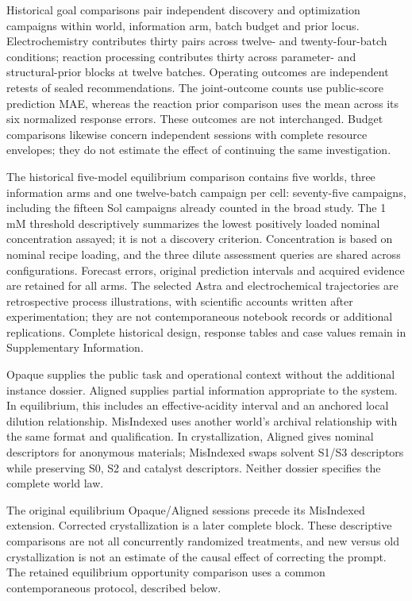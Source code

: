 \documentclass[10pt,a4paper]{article}
\begin{document}
Historical goal comparisons pair independent discovery and optimization campaigns within world, information arm, batch budget and prior locus. Electrochemistry contributes thirty pairs across twelve- and twenty-four-batch conditions; reaction processing contributes thirty across parameter- and structural-prior blocks at twelve batches. Operating outcomes are independent retests of sealed recommendations. The joint-outcome counts use public-score prediction MAE, whereas the reaction prior comparison uses the mean across its six normalized response errors. These outcomes are not interchanged. Budget comparisons likewise concern independent sessions with complete resource envelopes; they do not estimate the effect of continuing the same investigation.

The historical five-model equilibrium comparison contains five worlds, three information arms and one twelve-batch campaign per cell: seventy-five campaigns, including the fifteen Sol campaigns already counted in the broad study. The 1 mM threshold descriptively summarizes the lowest positively loaded nominal concentration assayed; it is not a discovery criterion. Concentration is based on nominal recipe loading, and the three dilute assessment queries are shared across configurations. Forecast errors, original prediction intervals and acquired evidence are retained for all arms. The selected Astra and electrochemical trajectories are retrospective process illustrations, with scientific accounts written after experimentation; they are not contemporaneous notebook records or additional replications. Complete historical design, response tables and case values remain in Supplementary Information.

Opaque supplies the public task and operational context without the additional instance dossier. Aligned supplies partial information appropriate to the system. In equilibrium, this includes an effective-acidity interval and an anchored local dilution relationship. MisIndexed uses another world's archival relationship with the same format and qualification. In crystallization, Aligned gives nominal descriptors for anonymous materials; MisIndexed swaps solvent S1/S3 descriptors while preserving S0, S2 and catalyst descriptors. Neither dossier specifies the complete world law.

The original equilibrium Opaque/Aligned sessions precede its MisIndexed extension. Corrected crystallization is a later complete block. These descriptive comparisons are not all concurrently randomized treatments, and new versus old crystallization is not an estimate of the causal effect of correcting the prompt. The retained equilibrium opportunity comparison uses a common contemporaneous protocol, described below.
\end{document}
